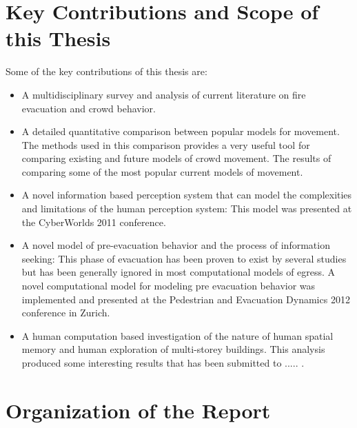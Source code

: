 
\section{Key Contributions and Scope of this Thesis}
\label{Intro:Contributions}

Some of the key contributions of this thesis are:
\begin{itemize}
	\item A multidisciplinary survey and analysis of current literature on fire evacuation and crowd behavior.

	\item A detailed quantitative comparison between popular models for movement. The methods used in this comparison provides a very useful tool for comparing existing and future models of crowd movement. The results of comparing some of the most popular current models of movement.

	\item A novel information based perception system that can model the complexities and limitations of the human perception system: This model was presented at the CyberWorlds 2011 conference.

	\item A novel model of pre-evacuation behavior and the process of information seeking: This phase of evacuation has been proven to exist by several studies but has been generally ignored in most computational models of egress. A novel computational model for modeling pre evacuation behavior was implemented and presented at the Pedestrian and Evacuation Dynamics 2012 conference in Zurich.

	\item A human computation based investigation of the nature of human spatial memory and human exploration of multi-storey buildings. This analysis produced some interesting results that has been submitted to  .....  . 

	

\end{itemize}


\section{Organization of the Report}
\label{Intro:Organisation}

